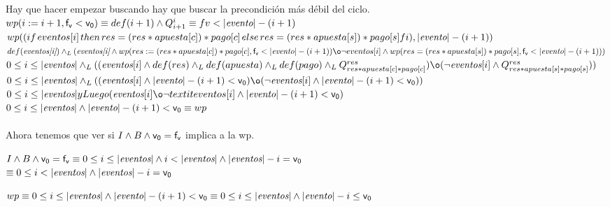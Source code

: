 \documentclass[10pt,a4paper]{article}
\begin{document}
\begin{enumerate}
        Hay que hacer empezar buscando hay que buscar la precondición más débil del ciclo. \\
        $wp(i := i + 1,{\mathsf{f_{v}} < \mathsf{v_{0}}}) \equiv def(i+1) \land Q_{i+1}^{i} \equiv fv < |\textit{evento}\vert - (i+1)$ \\
        $wp((if \hspace{0.5mm} eventos[i] \hspace{0.5mm} then  \hspace{0.5mm} res=(res*apuesta[c])*pago[c]  \hspace{0.5mm} else \hspace{0.5mm} res=(res*apuesta[s])*pago[s] fi),|\textit{evento}\vert - (i+1)) \\$
        $def(\textit{eventos[i]}) \yLuego (\textit{eventos[i]} \y wp(res:=(res*apuesta[c])*pago[c],\funcionDecresiente < |\textit{evento}\vert - (i+1)) \o \neg eventos[i] \y wp(res=(res*apuesta[s])*pago[s],\funcionDecresiente < |\textit{evento}\vert - (i+1))) $ \\
        $0 \leq i \leq |{\textit{eventos}}\vert \yLuego ((\textit{eventos}[i] \y def(res) \yLuego def(apuesta) \yLuego def(pago) \yLuego Q_{res*apuesta[c]*pago[c]}^{res}) \o (\neg\textit{eventos}[i] \y Q_{res*apuesta[s]*pago[s]}^{res}))$ \\
        $0 \leq i \leq |{\textit{eventos}}\vert \yLuego ((\textit{eventos}[i]  \y |\textit{evento}\vert - (i+1)<\metavariable) \o (\neg\textit{eventos}[i] \y |\textit{evento}\vert - (i+1)<\metavariable))$ \\
        $0 \leq i \leq |{\textit{eventos}}\vert yLuego (\textit{eventos}[i] \o \neg textit{eventos}[i] \y |\textit{evento}\vert - (i+1)<\metavariable) $\\
        $0 \leq i \leq |{\textit{eventos}}\vert \land |\textit{evento}\vert - (i+1)<\mathsf{v_{0}} \equiv wp $ \\\\
        Ahora tenemos que ver si $I \land B \land \mathsf{v_{0}} = \mathsf{f_{v}}$ implica a la wp.
        
        $I \land B \land \mathsf{v_{0}} = \mathsf{f_{v}} \equiv 0 \leq i \leq |{\textit{eventos}}\vert \land i < |{\textit{eventos}}\vert \land |{\textit{eventos}}\vert-i= \mathsf{v_{0}}$ \\
        $ \equiv 0 \leq i < |{\textit{eventos}}\vert \land |{\textit{eventos}}\vert-i= \mathsf{v_{0}} $

        $wp \equiv 0 \leq i \leq |{\textit{eventos}}\vert \land |\textit{evento}\vert - (i+1)<\mathsf{v_{0}} \equiv 0 \leq i \leq |{\textit{eventos}}\vert \land |\textit{evento}\vert - i \leq \mathsf{v_{0}}  $


\end{enumerate}
\end{document}
